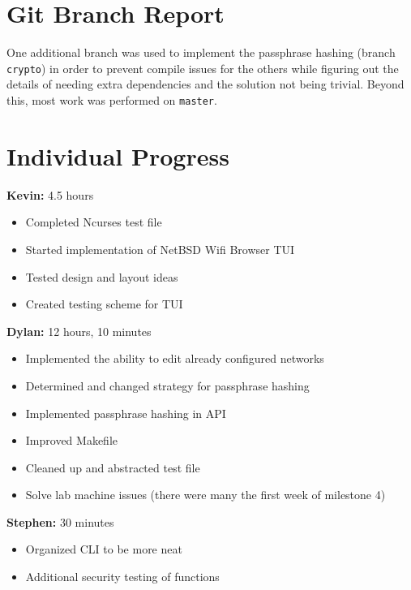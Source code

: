 \documentclass[11pt]{article}
\begin{document}
\section{Git Branch Report}
One additional branch was used to implement the passphrase hashing (branch \texttt{crypto})
in order to prevent compile issues for the others while figuring out the
details of needing extra dependencies and the solution not being trivial.
Beyond this, most work was performed on \texttt{master}.


\section{Individual Progress}

\textbf{Kevin:} 4.5 hours
\begin{itemize}
  \item Completed Ncurses test file
  \item Started implementation of NetBSD Wifi Browser TUI
  \item Tested design and layout ideas
  \item Created testing scheme for TUI
\end{itemize}

\textbf{Dylan:} 12 hours, 10 minutes
\begin{itemize}
  \item Implemented the ability to edit already configured networks
  \item Determined and changed strategy for passphrase hashing
  \item Implemented passphrase hashing in API
  \item Improved Makefile
  \item Cleaned up and abstracted test file
  \item Solve lab machine issues (there were many the first week of milestone 4)
\end{itemize}

\textbf{Stephen:} 30 minutes
\begin{itemize}
  \item Organized CLI to be more neat
  \item Additional security testing of functions
\end{itemize}
\end{document}
